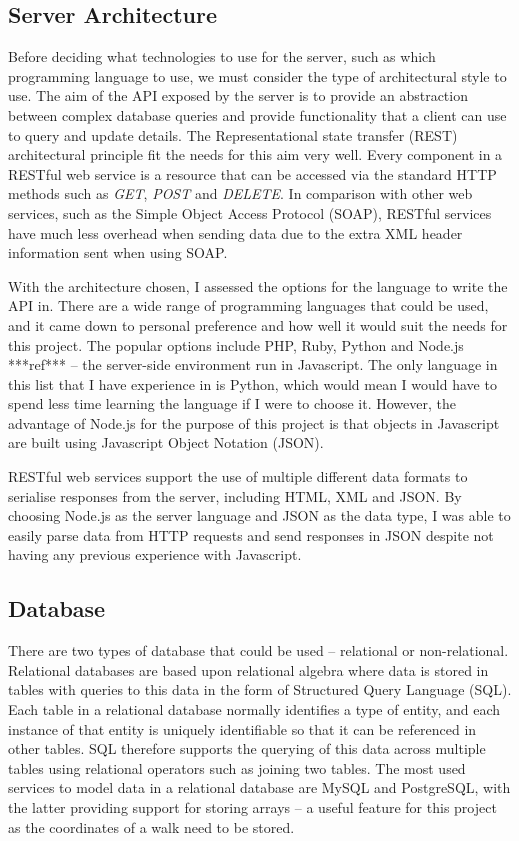 
\subsection{Server Architecture} \label{subsection:server-architecture}

Before deciding what technologies to use for the server, such as which programming language to use, we must consider the type of architectural style to use. The aim of the API exposed by the server is to provide an abstraction between complex database queries and provide functionality that a client can use to query and update details. The Representational state transfer (REST) architectural principle fit the needs for this aim very well. Every component in a RESTful web service is a resource that can be accessed via the standard HTTP methods such as \textit{GET}, \textit{POST} and \textit{DELETE}. In comparison with other web services, such as the Simple Object Access Protocol (SOAP), RESTful services have much less overhead when sending data due to the extra XML header information sent when using SOAP.

With the architecture chosen, I assessed the options for the language to write the API in. There are a wide range of programming languages that could be used, and it came down to personal preference and how well it would suit the needs for this project. The popular options include PHP, Ruby, Python and Node.js ***ref*** -- the server-side environment run in Javascript. The only language in this list that I have experience in is Python, which would mean I would have to spend less time learning the language if I were to choose it. However, the advantage of Node.js for the purpose of this project is that objects in Javascript are built using Javascript Object Notation (JSON).

 RESTful web services support the use of multiple different data formats to serialise responses from the server, including HTML, XML and JSON. By choosing Node.js as the server language and JSON as the data type, I was able to easily parse data from HTTP requests and send responses in JSON despite not having any previous experience with Javascript.

\subsection{Database}

There are two types of database that could be used -- relational or non-relational. Relational databases are based upon relational algebra where data is stored in tables with queries to this data in the form of Structured Query Language (SQL). Each table in a relational database normally identifies a type of entity, and each instance of that entity is uniquely identifiable so that it can be referenced in other tables. SQL therefore supports the querying of this data across multiple tables using relational operators such as joining two tables. The most used services to model data in a relational database are MySQL and PostgreSQL, with the latter providing support for storing arrays -- a useful feature for this project as the coordinates of a walk need to be stored.

